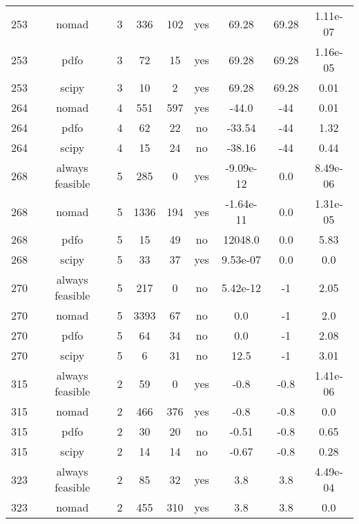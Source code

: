 \begin{scriptsize}
\begin{center}
\begin{longtable}{ccccccccc}
253 &           nomad &  3 &    336 &    102 &     yes &       69.28 &       69.28 & 1.11e-07\\
253 &            pdfo &  3 &     72 &     15 &     yes &       69.28 &       69.28 & 1.16e-05\\
253 &           scipy &  3 &     10 &      2 &     yes &       69.28 &       69.28 &     0.01\\
264 &           nomad &  4 &    551 &    597 &     yes &       -44.0 &         -44 &     0.01\\
264 &            pdfo &  4 &     62 &     22 &      no &      -33.54 &         -44 &     1.32\\
264 &           scipy &  4 &     15 &     24 &      no &      -38.16 &         -44 &     0.44\\
268 & always feasible &  5 &    285 &      0 &     yes &   -9.09e-12 &         0.0 & 8.49e-06\\
268 &           nomad &  5 &   1336 &    194 &     yes &   -1.64e-11 &         0.0 & 1.31e-05\\
268 &            pdfo &  5 &     15 &     49 &      no &     12048.0 &         0.0 &     5.83\\
268 &           scipy &  5 &     33 &     37 &     yes &    9.53e-07 &         0.0 &      0.0\\
270 & always feasible &  5 &    217 &      0 &      no &    5.42e-12 &          -1 &     2.05\\
270 &           nomad &  5 &   3393 &     67 &      no &         0.0 &          -1 &      2.0\\
270 &            pdfo &  5 &     64 &     34 &      no &         0.0 &          -1 &     2.08\\
270 &           scipy &  5 &      6 &     31 &      no &        12.5 &          -1 &     3.01\\
315 & always feasible &  2 &     59 &      0 &     yes &        -0.8 &        -0.8 & 1.41e-06\\
315 &           nomad &  2 &    466 &    376 &     yes &        -0.8 &        -0.8 &      0.0\\
315 &            pdfo &  2 &     30 &     20 &      no &       -0.51 &        -0.8 &     0.65\\
315 &           scipy &  2 &     14 &     14 &      no &       -0.67 &        -0.8 &     0.28\\
323 & always feasible &  2 &     85 &     32 &     yes &         3.8 &         3.8 & 4.49e-04\\
323 &           nomad &  2 &    455 &    310 &     yes &         3.8 &         3.8 &      0.0\\

\end{longtable}
\end{center}
\end{scriptsize}
